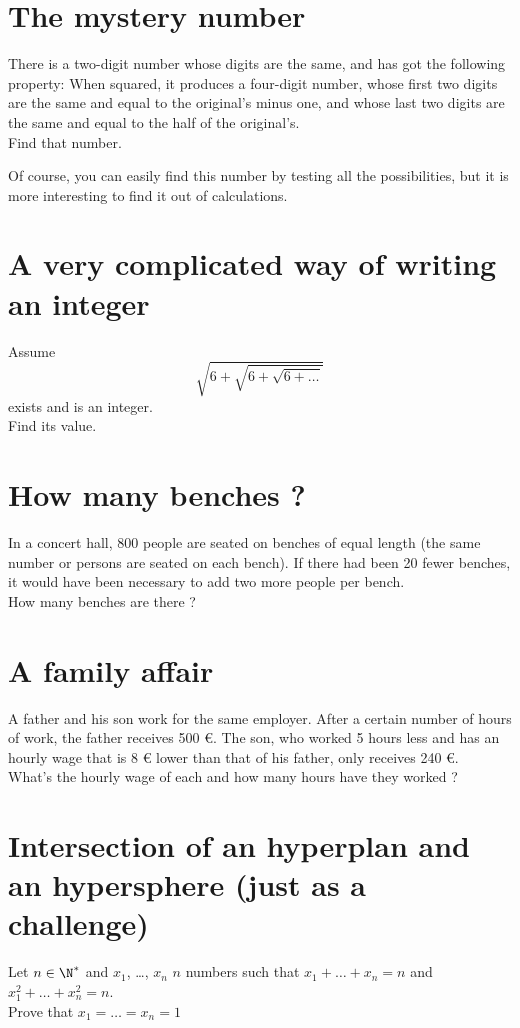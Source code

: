 \documentclass[12pt,a4paper,article,english,firamath]{nsi}
\begin{document}
\maketitle


\section*{The mystery number}
There is a two-digit number whose digits are the same, and has got the following property: When squared, it produces a four-digit number, whose first two digits are the same and equal to the original's minus one, and whose last two digits are the same and equal to the half of the original's.\\
Find that number.

\begin{remarque}[]
    Of course, you can easily find this number by testing all the possibilities, but it is more interesting to find it out of calculations.
\end{remarque}

\section*{A very complicated way of writing an integer}

Assume $$\sqrt{6+\sqrt{6+\sqrt{6+\ldots}}}$$ exists and is an integer.\\
Find its value.


\section*{How many benches ?}
In a concert hall, 800 people are seated on benches of equal length (the same number or persons are seated on each bench). If there had been 20 fewer benches, it would have been necessary to add two more people per bench.\\
 How many benches are there ?


\section*{A family affair}
A father and his son work for the same employer. After a certain number of hours of work, the father receives 500 €. The son, who worked 5 hours less and has an hourly wage that is 8 € lower than that of his father, only receives 240 €. \\

What's the hourly wage of each and how many hours have they worked ?

\section*{Intersection of an hyperplan and an hypersphere \small(just as a challenge)}

Let $n\in\N^*$ and $x_1$, \ldots, $x_n$ $n$ numbers such that $x_1+\ldots +x_n = n$ and $x_1^2+\ldots +x_n^2 = n$.\\

Prove that $x_1=\ldots=x_n=1$
\end{document}
